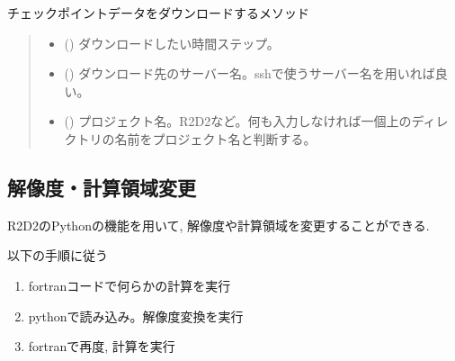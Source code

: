 \documentclass[letterpaper,10pt,dvipdfmx,report]{sphinxmanual}
\begin{document}
\begin{fulllineitems}
\label{\detokenize{io:R2D2.R2D2_data.sync_check}}
\pysigstartsignatures
{}
\pysigstopsignatures
\sphinxAtStartPar
チェックポイントデータをダウンロードするメソッド
\begin{quote}\begin{description}
\begin{itemize}
\item {} 
\sphinxAtStartPar
{} () \sphinxhyphen{}\sphinxhyphen{} ダウンロードしたい時間ステップ。

\item {} 
\sphinxAtStartPar
{} () \sphinxhyphen{}\sphinxhyphen{} ダウンロード先のサーバー名。sshで使うサーバー名を用いれば良い。

\item {} 
\sphinxAtStartPar
{} () \sphinxhyphen{}\sphinxhyphen{} プロジェクト名。\textquotesingle{}R2D2\textquotesingle{}など。何も入力しなければ一個上のディレクトリの名前をプロジェクト名と判断する。

\end{itemize}

\end{description}\end{quote}

\end{fulllineitems}



\subsection{解像度・計算領域変更}
\label{\detokenize{io:id7}}
\sphinxAtStartPar
R2D2のPythonの機能を用いて, 解像度や計算領域を変更することができる.

\sphinxAtStartPar
以下の手順に従う
\begin{enumerate}
%
\item {} 
\sphinxAtStartPar
fortranコードで何らかの計算を実行

\item {} 
\sphinxAtStartPar
pythonで読み込み。解像度変換を実行

\item {} 
\sphinxAtStartPar
fortranで再度, 計算を実行

\end{enumerate}
\end{document}
